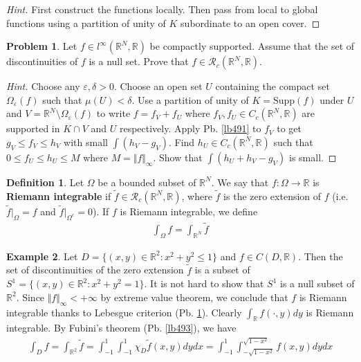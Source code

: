 \documentclass[12pt,b5paper,notitlepage]{article}
\theoremstyle{definition}
\newtheorem{df}{Definition}[section]
\newtheorem{eg}[df]{Example}
\newtheorem{prob}{\color{red}Problem}[section]
\theoremstyle{plain}
\newcommand{\wtd}{\widetilde}
\newcommand{\scr}{\mathscr}
\newcommand{\Rbb}{\mathbb R}
\newcommand{\Supp}{\mathrm{Supp}}
\newcommand{\eps}{\varepsilon}
\numberwithin{equation}{section}
\begin{document}
\begin{proof}[Hint]
First construct the functions locally. Then pass from local to global functions using a partition of unity of $K$ subordinate to an open cover.
\end{proof}


\begin{prob}\label{lb492}
Let $f\in l^\infty(\Rbb^N,\Rbb)$ be compactly supported. Assume that the set of discontinuities of $f$ is a null set. Prove that $f\in\scr R_c(\Rbb^N,\Rbb)$.
\end{prob}


\begin{proof}[Hint]
Choose any $\eps,\delta>0$. Choose an open set $U$ containing the compact set $\Omega_\eps(f)$ such that $\mu(U)<\delta$. Use a partition of unity of $K=\Supp(f)$ under $U$ and $V=\Rbb^N\setminus\Omega_\eps(f)$ to write $f=f_V+f_U$ where $f_V,f_U\in C_c(\Rbb^N,\Rbb)$ are supported in $K\cap V$ and $U$ respectively. Apply Pb. \ref{lb491} to $f_V$ to get $g_V\leq f_V\leq h_V$ with small $\int(h_V-g_V)$.  Find $h_U\in C_c(\Rbb^N,\Rbb)$ such that $0\leq f_U\leq h_U\leq M$ where $M=\Vert f\Vert_\infty$. Show that $\int(h_U+h_V-g_V)$ is small.
\end{proof}



\begin{df}
Let $\Omega$ be a bounded subset of $\Rbb^N$. We say that $f:\Omega\rightarrow\Rbb$ is \textbf{Riemann integrable}  if $\wtd f\in\scr R_c(\Rbb^N,\Rbb)$, where $\wtd f$ is the zero extension of $f$ (i.e. $\wtd f|_\Omega=f$ and $\wtd f|_{\Omega^c}=0$). If $f$ is Riemann integrable, we define
\begin{align*}
\int_\Omega f=\int_{\Rbb^N}\wtd f
\end{align*}
\end{df}


\begin{eg}
Let $D=\{(x,y)\in\Rbb^2:x^2+y^2\leq1\}$ and $f\in C(D,\Rbb)$. Then the set of discontinuities of the zero extension $\wtd f$ is a subset of $S^1=\{(x,y)\in\Rbb^2:x^2+y^2=1\}$. It is not hard to show that $S^1$ is a null subset of $\Rbb^2$. Since $\Vert f\Vert_\infty<+\infty$ by extreme value theorem, we conclude that $f$ is Riemann integrable thanks to Lebesgue criterion (Pb. \ref{lb492}). Clearly $\int_\Rbb f(\cdot,y)dy$ is Riemann integrable. By Fubini's theorem (Pb. \ref{lb493}), we have
\begin{align*}
\int_D f=\int_{\Rbb^2}\wtd f=\int_{-1}^1\int_{-1}^1 \chi_D\wtd f(x,y)dydx=\int_{-1}^1\int_{-\sqrt{1-x^2}}^{\sqrt{1-x^2}}f(x,y)dydx
\end{align*}
\end{eg}
\end{document}
